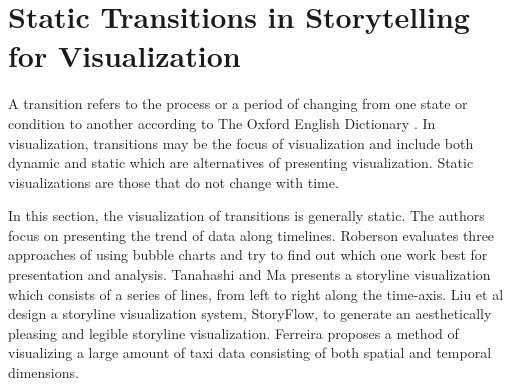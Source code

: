\documentclass{egpubl}
\begin{document}
\section{Static Transitions in Storytelling for Visualization}
A transition refers to the process or a period of changing from one state or condition to another according to The Oxford English Dictionary \cite{transition}. In visualization, transitions may be the focus of visualization and include both dynamic and static which are alternatives of presenting visualization. Static visualizations are those that do not change with time. 

In this section, the visualization of transitions is generally static. The authors focus on presenting the trend of data along timelines. Roberson \cite{Rebortson} evaluates three approaches of using bubble charts and try to find out which one work best for presentation and analysis. Tanahashi and Ma \cite{Tanahashi} presents a storyline visualization which consists of a series of lines, from left to right along the time-axis.  Liu et al \cite{shixia} design a storyline visualization system, StoryFlow, to generate an aesthetically pleasing and legible storyline visualization. Ferreira \cite{ferreira2013} proposes a method of visualizing a large amount of taxi data consisting of both spatial and temporal dimensions.
\end{document}
